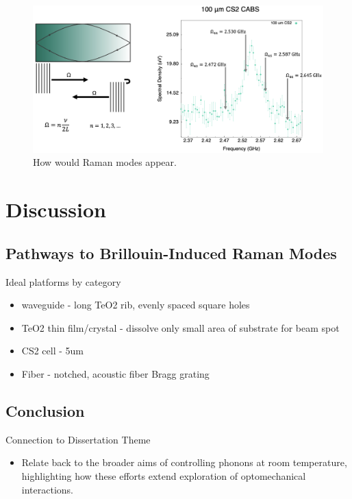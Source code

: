 \begin{figure}[t]
  \centering
  \includegraphics[width=\textwidth]{figs/4-Raman/HowWouldRamanModesAppear.png}
  \caption{How would Raman modes appear.}
  \label{fig:HowWouldRamanModesAppear}
\end{figure}


\section{Discussion}
\label{sec:Raman:Discussion}

\subsection{Pathways to Brillouin-Induced Raman Modes}
\label{subsec:Raman:Pathways}

Ideal platforms by category
\begin{itemize}
  \item waveguide - long TeO2 rib, evenly spaced square holes
  \item TeO2 thin film/crystal - dissolve only small area of substrate for beam spot
  \item CS2 cell - 5um
  \item Fiber - notched, acoustic fiber Bragg grating
\end{itemize}

\subsection{Conclusion}
\label{subsec:Raman:Conclusion}

Connection to Dissertation Theme
\begin{itemize}
  \item Relate back to the broader aims of controlling phonons at room temperature, highlighting how these efforts extend exploration of optomechanical interactions.
\end{itemize}

\clearpage
\thispagestyle{empty}
\null
\newpage

